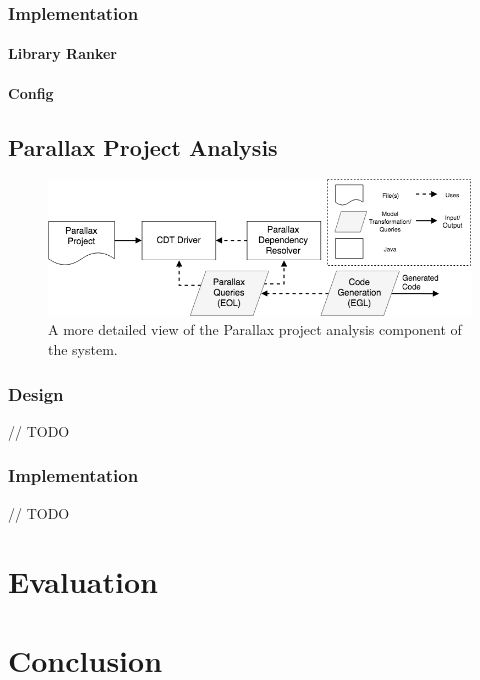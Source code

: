 \documentclass{UoYCSproject}
\begin{document}
\subsection{Implementation}
\subsubsection{Library Ranker}
\subsubsection{Config}

\section{Parallax Project Analysis} \label{parallax_design}
\begin{figure}[h!]
  \centering
  \includegraphics[width=0.8\linewidth]{graphics/parallax_project_analysis.png}
  \caption{A more detailed view of the Parallax project analysis component of the system.}
  \label{fig:parallax_analysis}
\end{figure}

\subsection{Design}
// TODO
\subsection{Implementation}
// TODO

\chapter{Evaluation}

\chapter{Conclusion}

\printbibliography
\end{document}
